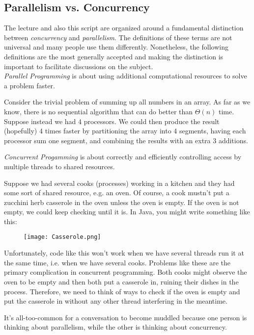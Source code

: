 \documentclass[main]{subfiles}
\begin{document}
\subsection{Parallelism vs. Concurrency}
The lecture and also this script are organized around a fundamental distinction between \textit{concurrency} and \textit{parallelism}. The definitions of these terms are not universal and many people use them differently. Nonetheless, the following definitions are the most generally accepted and making the distinction is important to facilitate discussions on the subject.\\[3mm]
\textit{Parallel Programming} is about using additional computational resources to solve a problem faster. 
\begin{example}
    Consider the trivial problem of summing up all numbers in an array. As far as we know, there is no sequential algorithm that can do better than $\Theta(n)$ time. Suppose instead we had 4 processors. We could then produce the result (hopefully) 4 times faster by partitioning the array into 4 segments, having each processor sum one segment, and combining the results with an extra 3 additions.
\end{example}
\textit{Concurrent Progamming} is about correctly and efficiently controlling access by multiple threads to shared resources.
\begin{example}
    Suppose we had several cooks (processes) working in a kitchen and they had some sort of shared resource, e.g. an oven. Of course, a cook mustn't put a zucchini herb casserole in the oven unless the oven is empty. If the oven is not empty, we could keep checking until it is. In Java, you might write something like this: 
    \begin{figure}[H]
        \centering
        \texttt{[image: Casserole.png]}
    \end{figure}
    Unfortunately, code like this won't work when we have several threads run it at the same time, i.e. when we have several cooks. Problems like these are the primary complication in concurrent programming. Both cooks might observe the oven to be empty and then both put a casserole in, ruining their dishes in the process. Therefore, we need to think of ways to check if the oven is empty and put the casserole in without any other thread interfering in the meantime.
\end{example}
It's all-too-common for a conversation to become muddled because one person is thinking about parallelism, while the other is thinking about concurrency.\\[3mm]
\end{document}
